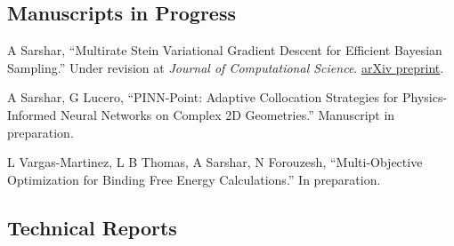 \documentclass[11pt,letterpaper]{report}
\begin{document}





    \subsection*{Manuscripts in Progress}

    \begin{tablist}
        \item[2026] \tab{} A Sarshar, \enquote{Multirate Stein Variational Gradient Descent for Efficient Bayesian Sampling.}
        Under revision at \textit{Journal of Computational Science}. \href{https://arxiv.org/abs/2604.03981}{arXiv preprint}.

        \item[2026] \tab{} A Sarshar, G Lucero, \enquote{PINN-Point: Adaptive Collocation Strategies for Physics-Informed Neural Networks on Complex 2D Geometries.} Manuscript in preparation.

        \item[2026] \tab{} L Vargas-Martinez, L B Thomas, A Sarshar, N Forouzesh, \enquote{Multi-Objective Optimization for Binding Free Energy Calculations.} In preparation.
    \end{tablist}

    \subsection*{Technical Reports}
\end{document}
